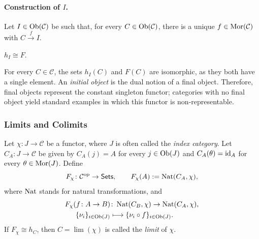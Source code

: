 \documentclass[11pt,a4paper]{article}
\begin{document}
\paragraph{Construction of $I$.}
Let $I\in\operatorname{Ob}(\mathcal C)$ be such that, for every $C\in\operatorname{Ob}(\mathcal C)$,
there is a unique $f\in\operatorname{Mor}(\mathcal C)$ with $C\xrightarrow{f}I$.
\begin{claim}
$h_I\cong F$.
\end{claim}
For every $C\in\mathcal C$, the sets $h_I(C)$ and $F(C)$ are isomorphic,
as they both have a single element. An \emph{initial object} is the dual notion
of a final object. Therefore, final objects represent the constant singleton functor;
categories with no final object yield standard examples in which this functor is non-representable.
\subsubsection{Limits and Colimits}
Let $\chi\colon J\to\mathcal C$ be a functor, where $J$ is often called the
\emph{index category}. Let $C_A\colon J\to\mathcal C$ be given by
$C_A(j)=A$ for every $j\in\operatorname{Ob}(J)$ and $C_A(\theta)=\operatorname{id}_A$ for every
$\theta\in\operatorname{Mor}(J)$. Define
\[
 F_\chi\colon\mathcal C^{\mathrm{op}}\to\mathsf{Sets},\qquad
 F_\chi(A):=\operatorname{Nat}(C_A,\chi),
\]
where $\operatorname{Nat}$ stands for natural transformations, and
\[
 \begin{aligned}
 F_\chi(f\colon A\to B)&\colon\operatorname{Nat}(C_B,\chi)\to\operatorname{Nat}(C_A,\chi),\\
 \{\nu_i\}_{i\in\operatorname{Ob}(J)}&\longmapsto
 \{\nu_i\circ f\}_{i\in\operatorname{Ob}(J)}.
 \end{aligned}
\]
If $F_\chi\cong h_C$, then $C=\lim(\chi)$ is called the \emph{limit} of $\chi$.
\end{document}
